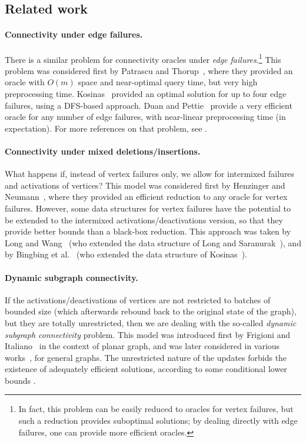 \documentclass[11pt,a4paper]{article}
\begin{document}
\subsection{Related work}

\paragraph{Connectivity under edge failures.}
There is a similar problem for connectivity oracles under \emph{edge failures}.\footnote{In fact, this problem can be easily reduced to oracles for vertex failures, but such a reduction provides suboptimal solutions; by dealing directly with edge failures, one can provide more efficient oracles.} This problem was considered first by Patrascu and Thorup~\cite{DBLP:conf/focs/PatrascuT07}, where they provided an oracle with $O(m)$ space and near-optimal query time, but very high preprocessing time. Kosinas~\cite{DBLP:conf/soda/Kosinas24} provided an optimal solution for up to four edge failures, using a DFS-based approach. Duan and Pettie~\cite{DBLP:journals/siamcomp/DuanP20} provide a very efficient oracle for any number of edge failures, with near-linear preprocessing time (in expectation). For more references on that problem, see \cite{DBLP:journals/siamcomp/DuanP20}. 

\paragraph{Connectivity under mixed deletions/insertions.}
What happens if, instead of vertex failures only, we allow for intermixed failures and activations of vertices? This model was considered first by Henzinger and Neumann~\cite{DBLP:conf/esa/HenzingerN16}, where they provided an efficient reduction to any oracle for vertex failures. However, some data structures for vertex failures have the potential to be extended to the intermixed activations/deactivations version, so that they provide better bounds than a black-box reduction. This approach was taken by Long and Wang~\cite{DBLP:conf/icalp/LongW24} (who extended the data structure of Long and Saranurak~\cite{DBLP:conf/focs/LongS22}), and by Bingbing et al.~\cite{DBLP:conf/esa/HuK024} (who extended the data structure of Kosinas~\cite{DBLP:conf/esa/Kosinas23}). 

\paragraph{Dynamic subgraph connectivity.}
If the activations/deactivations of vertices are not restricted to batches of bounded size (which afterwards rebound back to the original state of the graph), but they are totally unrestricted, then we are dealing with the so-called \emph{dynamic subgraph connectivity} problem. This model was introduced first by Frigioni and Italiano~\cite{DBLP:journals/algorithmica/FrigioniI00} in the context of planar graph, and was later considered in various works~\cite{DBLP:conf/icalp/Duan10, DBLP:journals/siamcomp/ChanPR11, DBLP:conf/wads/DuanZ17}, for general graphs. The unrestricted nature of the updates forbids the existence of adequately efficient solutions, according to some conditional lower bounds \cite{DBLP:conf/stoc/HenzingerKNS15, DBLP:conf/stoc/JinX22}.
\end{document}

